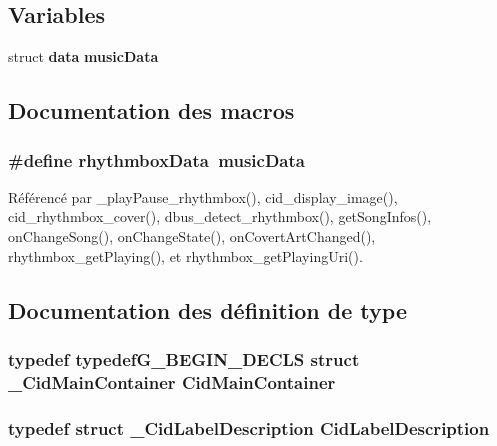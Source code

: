 \subsection*{Variables}
\begin{CompactItemize}
\item 
struct {\bf data} {\bf musicData}
\end{CompactItemize}


\subsection{Documentation des macros}
\subsubsection{\setlength{\rightskip}{0pt plus 5cm}\#define rhythmboxData~{\bf musicData}}\label{cid-struct_8h_37fcdf3eced785bdd4418fbbf9d616a7}




Référencé par \_\-playPause\_\-rhythmbox(), cid\_\-display\_\-image(), cid\_\-rhythmbox\_\-cover(), dbus\_\-detect\_\-rhythmbox(), getSongInfos(), onChangeSong(), onChangeState(), onCovertArtChanged(), rhythmbox\_\-getPlaying(), et rhythmbox\_\-getPlayingUri().

\subsection{Documentation des définition de type}
\subsubsection{\setlength{\rightskip}{0pt plus 5cm}typedef typedefG\_\-BEGIN\_\-DECLS struct {\bf \_\-CidMainContainer} {\bf CidMainContainer}}\label{cid-struct_8h_4e1f96a6293d819d2bd5ba782babd62b}


\subsubsection{\setlength{\rightskip}{0pt plus 5cm}typedef struct {\bf \_\-CidLabelDescription} {\bf CidLabelDescription}}\label{cid-struct_8h_d4e3211c4113b55777b415e1bc109ce9}


